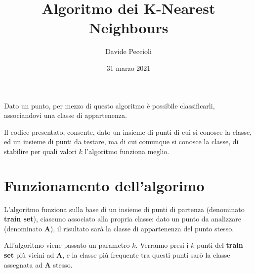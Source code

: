 \documentclass[a4paper]{article}
\title{Algoritmo dei K-Nearest Neighbours}
\date{31 marzo 2021}
\author{Davide Peccioli}
\begin{document}
\maketitle

Dato un punto, per mezzo di questo algoritmo è possibile classificarli, associandovi una classe di appartenenza.

Il codice presentato, consente, dato un insieme di punti di cui si conosce la classe, ed un insieme di punti da testare, ma di cui comunque si conosce la classe, di stabilire per quali valori $k$ l'algoritmo funziona meglio.

\section{Funzionamento dell'algorimo}

L'algoritmo funziona sulla base di un insieme di punti di partenza (denominato \textbf{train set}), ciascuno associato alla propria classe: dato un punto da analizzare (denominato \textbf{A}), il risultato sarà la classe di appartenenza del punto stesso.

All'algoritmo viene passato un parametro $k$. Verranno presi i $k$ punti del \textbf{train set} più vicini ad \textbf{A}, e la classe più frequente tra questi punti sarò la classe assegnata ad \textbf{A} stesso.
\end{document}

